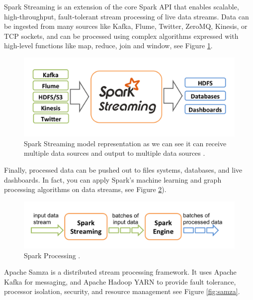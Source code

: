 \documentclass[twoside,12pt, a4paper]{report}
\begin{document}
Spark Streaming \cite{spark} is an extension of the core Spark API
\cite{shoro2015big} that enables scalable, high-throughput, fault-tolerant
stream processing of live data streams. Data can be ingested
from many sources like Kafka, Flume, Twitter, ZeroMQ,
Kinesis, or TCP sockets, and can be processed using
complex algorithms expressed with high-level functions like
map, reduce, join and window, see Figure \ref{fig:streams}.

\begin{figure}[!h]
    \centering
    \includegraphics[width=1\linewidth]{figures/streaming-arch.png}
    \caption{Spark Streaming model representation as we can see it can receive multiple data sources and output to multiple data sources \cite{spark}.}
    \label{fig:streams}
\end{figure}



Finally, processed data can be pushed out to files systems,
databases, and live dashboards. In fact, you can apply
Spark’s machine learning and graph processing algorithms
on data streams, see Figure \ref{fig:procs}).

\begin{figure}[!h]
    \centering
    \includegraphics[width=1\linewidth]{figures/streaming-flow.png}
    \caption{Spark Processing \cite{spark}.}
    \label{fig:procs}
\end{figure}



Apache Samza \cite{samza} is a distributed stream processing
framework. It uses Apache Kafka for messaging, and
Apache Hadoop YARN to provide fault tolerance, processor
isolation, security, and resource management see Figure \ref{fig:samza}.
\end{document}
